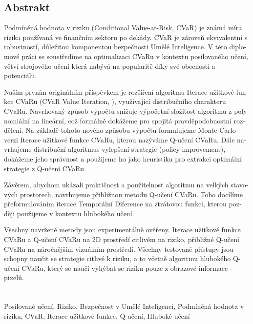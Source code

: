 \newpage

\begin{otherlanguage}{czech}
\chapter*{Abstrakt}
Podmíněná hodnota v riziku (Conditional Value-at-Risk, CVaR) je známá míra rizika používaná ve finančním sektoru po dekády. CVaR je zároveň ekvivalentní s robustností, důležitou komponentou bezpečnosti Umělé Inteligence. V této diplomové práci se soustředíme na optimalizaci CVaRu v kontextu posilovaného učení, větví strojového učení která nabývá na popularitě díky své obecnosti a potenciálu.

Naším prvním originálním příspěvkem je rozšíření algoritmu Iterace užitkové funkce CVaRu (CVaR Value Iteration, \citet{chow2015risk}), využívající distribučního charakteru CVaRu. Navrhovaný způsob výpočtu snižuje výpočetní složitost algoritmu z polynomiální na lineární, což formálně dokážeme pro spojitá pravděpodobnostní rozdělení.
Na základě tohoto nového způsobu výpočtu formulujeme Monte Carlo verzi Iterace užitkové funkce CVaRu, kterou nazýváme Q-učení CVaRu. Dále navrhujeme distribuční algoritmus vylepšení strategie (policy improvement), dokážeme jeho správnost a použijeme ho jako heuristiku pro extrakci optimální strategie z Q-učení CVaRu.

Závěrem, abychom ukázali praktičnost a použitelnost algoritmu na velkých stavových prostorech, navrhujeme přibližnou metodu Q-učení CVaRu. Toho docílíme přeformulováním iterace Temporální Diference na ztrátovou funkci, kterou později použijeme v kontextu hlubokého učení.

Všechny navržené metody jsou experimentálně ověřeny. Iterace užitkové funkce CVaRu a Q-učení CVaRu na 2D prostředí citlivém na riziko, přibližné Q-učení CVaRu na náročnějším vizuálním prostředí. Všechny testované přístupy jsou schopny naučit se strategie citlivé k riziku, a to včetně algoritmu hlubokého Q-učení CVaRu, který se naučí vyhýbat se riziku pouze z obrazové informace - pixelů.
\\
\\
\\
 Posilované učení, Riziko, Bezpečnost v Umělé Inteligenci, Podmíněná hodnota v riziku, CVaR, Iterace užitkové funkce, Q-učení, Hluboké učení

\end{otherlanguage}

\endgroup

\vfill
